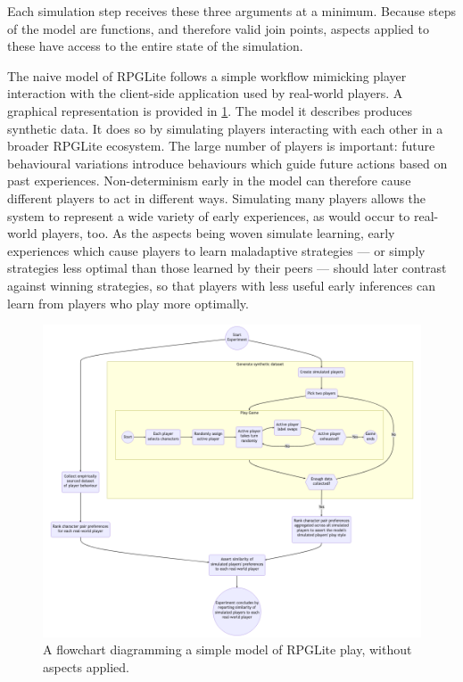 Each simulation step receives these three arguments at a minimum. Because steps
of the model are functions, and therefore valid join points, aspects applied to
these have access to the entire state of the simulation.

The naive model of RPGLite follows a simple workflow mimicking player
interaction with the client-side application used by real-world players.
A graphical representation is provided in \cref{fig:naive_model}. 
 The model it describes produces synthetic data.
It does so by simulating players interacting with each other in a broader
RPGLite ecosystem. The large number of players is important: future behavioural
variations introduce behaviours which guide future actions based on past
experiences. Non-determinism early in the model can therefore cause different
players to act in different ways. Simulating many players allows the system to
represent a wide variety of early experiences, as would occur to real-world
players, too. As the aspects being woven simulate learning, early experiences
which cause players to learn maladaptive strategies --- or simply strategies
less optimal than those learned by their peers --- should later contrast against
winning strategies, so that players with less useful early inferences can learn
from players who play more optimally.

\begin{figure}
  \centering
  \includegraphics[width=\columnwidth]{60_optimisation_with_aspects/diagrams/naive_model.png}
  \caption{A flowchart diagramming a simple model of RPGLite play, without
  aspects applied.}
  \label{fig:naive_model}
\end{figure}


